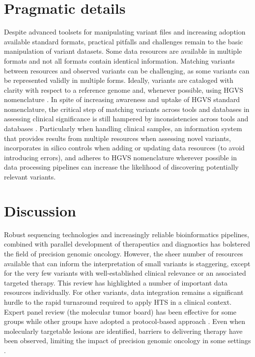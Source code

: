 \documentclass{article}
\begin{document}
\section{Pragmatic details}

Despite advanced toolsets for manipulating variant files and
increasing adoption available standard formats, practical pitfalls and
challenges remain to the basic manipulation of variant datasets. Some
data resources are available in multiple formats and not all formats
contain identical information. Matching variants between resources and
observed variants can be challenging, as some variants can be
represented validly in multiple forms. Ideally, variants are cataloged
with clarity with respect to a reference genome and, whenever
possible, using HGVS nomenclature \cite{Den_Dunnen2016-gw}. In spite
of increasing awareness and uptake of HGVS standard nomenclature, the
critical step of matching variants across tools and databases in
assessing clinical significance is still hampered by inconsistencies
across tools and databases \cite{Yen2017-lq}. Particularly when
handling clinical samples, an information system that provides results
from multiple resources when assessing novel variants, incorporates in
silico controls when adding or updating data resources (to avoid
introducing errors), and adheres to HGVS nomenclature wherever
possible in data processing pipelines can increase the likelihood of
discovering potentially relevant variants.

\section{Discussion}

Robust sequencing technologies and increasingly reliable
bioinformatics pipelines, combined with parallel development of
therapeutics and diagnostics has bolstered the field of precision
genomic oncology. However, the sheer number of resources available
that can inform the interpretation of small variants is staggering,
except for the very few variants with well-established clinical
relevance or an associated targeted therapy. This review has
highlighted a number of important data resources individually. For
other variants, data integration remains a significant hurdle to the
rapid turnaround required to apply HTS in a clinical context. Expert
panel review (the molecular tumor board) has been effective for some
groups \cite{Knepper2017-no,Beltran2015-pz,Sohal2015-bi} while other
groups have adopted a protocol-based approach
\cite{Ghazani2017-oo}. Even when molecularly targetable lesions are
identified, barriers to delivering therapy have been observed,
limiting the impact of precision genomic oncology in some settings
\cite{Bryce2017-ht}.
\end{document}
